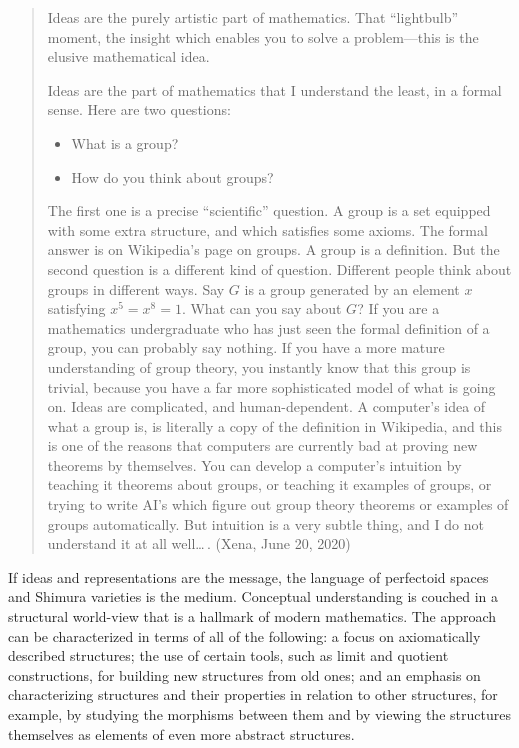\documentclass[12pt]{amsart}
\theoremstyle{definition}
\theoremstyle{remark}
\numberwithin{equation}{section}
\begin{document}
\begin{quotation}
  \noindent Ideas are the purely artistic part of mathematics. That ``lightbulb'' moment, the insight which enables you to solve a problem---this is the elusive mathematical idea.

  Ideas are the part of mathematics that I understand the least, in a formal sense. Here are two questions:
  \begin{itemize}
  \item What is a group?
  \item How do you think about groups?
  \end{itemize}
  The first one is a precise ``scientific'' question. A group is a set equipped with some extra structure, and which satisfies some axioms. The formal answer is on Wikipedia's page on groups. A group is a definition. But the second question is a different kind of question. Different people think about groups in different ways. Say $G$ is a group generated by an element $x$ satisfying $x^5=x^8=1$. What can you say about $G$? If you are a mathematics undergraduate who has just seen the formal definition of a group, you can probably say nothing. If you have a more mature understanding of group theory, you instantly know that this group is trivial, because you have a far more sophisticated model of what is going on. Ideas are complicated, and human-dependent. A computer's idea of what a group is, is literally a copy of the definition in Wikipedia, and this is one of the reasons that computers are currently bad at proving new theorems by themselves. You can develop a computer's intuition by teaching it theorems about groups, or teaching it examples of groups, or trying to write AI's which figure out group theory theorems or examples of groups automatically. But intuition is a very subtle thing, and I do not understand it at all well\ldots\,. (Xena, June 20, 2020)
\end{quotation}

If ideas and representations are the message, the language of perfectoid spaces and Shimura varieties is the medium. Conceptual understanding is couched in a structural world-view that is a hallmark of modern mathematics. The approach can be characterized in terms of all of the following: a focus on axiomatically described structures; the use of certain tools, such as limit and quotient constructions, for building new structures from old ones; and an emphasis on characterizing structures and their properties in relation to other structures, for example, by studying the morphisms between them and by viewing the structures themselves as elements of even more abstract structures.
\end{document}
